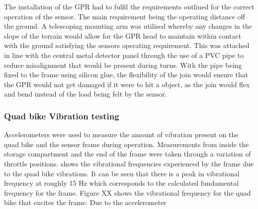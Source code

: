 \documentclass[main.tex]{subfiles}
\begin{document}
The installation of the GPR had to fulfil the requirements outlined for the correct operation of the sensor. The main requirement being the operating distance off the ground. A telescoping mounting arm was utilised whereby any changes in the slope of the terrain would allow for the GPR head to maintain within contact with the ground satisfying the sensors operating requirement. This was attached in line with the central metal detector panel through the use of a PVC pipe to reduce misalignment that would be present during turns. With the pipe being fixed to the frame using silicon glue, the flexibility of the join would ensure that the GPR would not get damaged if it were to hit a object, as the join would flex and bend instead of the load being felt by the sensor.  
  
\subsubsection{Quad bike Vibration testing}
Accelerometers were used to measure the amount of vibration present on the quad bike and the sensor frame during operation. Measurements from inside the storage compartment and the end of the frame were taken through a variation of throttle positions.  shows the vibrational frequencies experienced by the frame due to the quad bike vibrations. It can be seen that there is a peak in vibrational frequency at roughly 15 Hz which corresponds to the calculated fundamental frequency for the frame. Figure XX shows the vibrational frequency for the quad bike that excites the frame. Due to the accelerometer    
\end{document}
